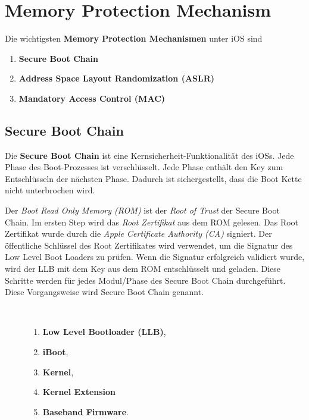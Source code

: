 \section{Memory Protection Mechanism}
\label{sec:MemoryProtection}
Die wichtigsten \textbf{Memory Protection Mechanismen} unter iOS sind
\begin{enumerate}
    \item \textbf{Secure Boot Chain}
    \item \textbf{Address Space Layout Randomization (ASLR)}
    \item \textbf{Mandatory Access Control (MAC)}
\end{enumerate}

\subsection{Secure Boot Chain}
\label{sec:SecBootChain}

Die \textbf{Secure Boot Chain} ist eine Kernsicherheit-Funktionalität des iOSs. Jede Phase des Boot-Prozesses ist verschlüsselt. Jede Phase enthält den Key zum Entschlüsseln der nächsten Phase. Dadurch ist sichergestellt, dass die Boot Kette nicht unterbrochen wird. \par

Der \textit{\glqq Boot Read Only Memory (ROM)\grqq{}} ist der \textit{\glqq Root of Trust\grqq{}} der Secure Boot Chain. Im ersten Step wird das \textit{\glqq Root Zertifikat\grqq{}} aus dem ROM gelesen. Das Root Zertifikat wurde durch die \textit{\glqq Apple Certificate Authority (CA)\grqq{}} signiert. Der öffentliche Schlüssel des Root Zertifikates wird verwendet, um die Signatur des Low Level Boot Loaders zu prüfen. Wenn die Signatur erfolgreich validiert wurde, wird der LLB mit dem Key aus dem ROM entschlüsselt und geladen. Diese Schritte werden für jedes Modul/Phase des Secure Boot Chain durchgeführt. Diese Vorgangsweise  wird Secure Boot Chain genannt.

\begin{description}
    \item[\parbox{\textwidth}{Die Secure Boot Chain beinhaltet folgende Module/Phasen}]~\par
   \begin{enumerate}
        \item \textbf{Low Level Bootloader (LLB)},
        \item \textbf{iBoot},
        \item \textbf{Kernel},
        \item \textbf{Kernel Extension}
        \item \textbf{Baseband Firmware}.
    \end{enumerate}
\end{description} 

